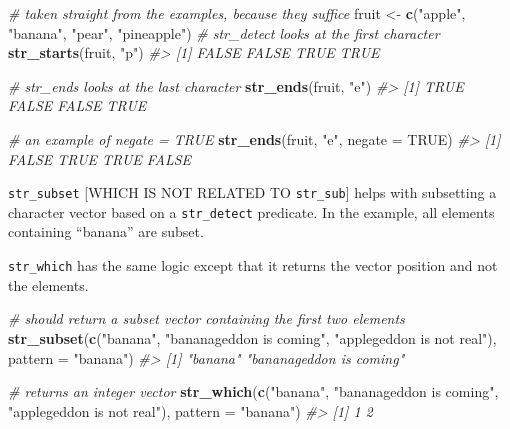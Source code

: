 \documentclass[]{book}
\newenvironment{Shaded}{}{}
\newcommand{\CommentTok}[1]{\textcolor[rgb]{0.38,0.63,0.69}{\textit{#1}}}
\newcommand{\DataTypeTok}[1]{\textcolor[rgb]{0.56,0.13,0.00}{#1}}
\newcommand{\KeywordTok}[1]{\textcolor[rgb]{0.00,0.44,0.13}{\textbf{#1}}}
\newcommand{\NormalTok}[1]{#1}
\newcommand{\OtherTok}[1]{\textcolor[rgb]{0.00,0.44,0.13}{#1}}
\newcommand{\StringTok}[1]{\textcolor[rgb]{0.25,0.44,0.63}{#1}}
\begin{document}
\begin{Shaded}
\begin{Highlighting}[]
\CommentTok{# taken straight from the examples, because they suffice}
\NormalTok{fruit <-}\StringTok{ }\KeywordTok{c}\NormalTok{(}\StringTok{"apple"}\NormalTok{, }\StringTok{"banana"}\NormalTok{, }\StringTok{"pear"}\NormalTok{, }\StringTok{"pineapple"}\NormalTok{)}
\CommentTok{# str_detect looks at the first character}
\KeywordTok{str_starts}\NormalTok{(fruit, }\StringTok{"p"}\NormalTok{)}
\CommentTok{#> [1] FALSE FALSE  TRUE  TRUE}

\CommentTok{# str_ends looks at the last character}
\KeywordTok{str_ends}\NormalTok{(fruit, }\StringTok{"e"}\NormalTok{)}
\CommentTok{#> [1]  TRUE FALSE FALSE  TRUE}

\CommentTok{# an example of negate = TRUE}
\KeywordTok{str_ends}\NormalTok{(fruit, }\StringTok{"e"}\NormalTok{, }\DataTypeTok{negate =} \OtherTok{TRUE}\NormalTok{)}
\CommentTok{#> [1] FALSE  TRUE  TRUE FALSE}
\end{Highlighting}
\end{Shaded}

\texttt{str\_subset} {[}WHICH IS NOT RELATED TO \texttt{str\_sub}{]} helps with subsetting a character vector based on a \texttt{str\_detect} predicate.
In the example, all elements containing ``banana'' are subset.

\texttt{str\_which} has the same logic except that it returns the vector position and not the elements.

\begin{Shaded}
\begin{Highlighting}[]
\CommentTok{# should return a subset vector containing the first two elements}
\KeywordTok{str_subset}\NormalTok{(}\KeywordTok{c}\NormalTok{(}\StringTok{"banana"}\NormalTok{,}
             \StringTok{"bananageddon is coming"}\NormalTok{,}
             \StringTok{"applegeddon is not real"}\NormalTok{),}
           \DataTypeTok{pattern =} \StringTok{"banana"}\NormalTok{)}
\CommentTok{#> [1] "banana"                 "bananageddon is coming"}

\CommentTok{# returns an integer vector}
\KeywordTok{str_which}\NormalTok{(}\KeywordTok{c}\NormalTok{(}\StringTok{"banana"}\NormalTok{,}
            \StringTok{"bananageddon is coming"}\NormalTok{,}
            \StringTok{"applegeddon is not real"}\NormalTok{),}
          \DataTypeTok{pattern =} \StringTok{"banana"}\NormalTok{)}
\CommentTok{#> [1] 1 2}
\end{Highlighting}
\end{Shaded}
\end{document}
